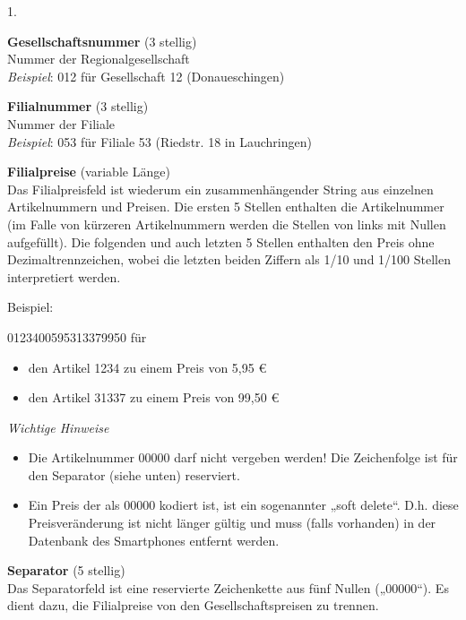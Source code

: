 \begin{seToplist}{1. }
\item[1. ]\textbf{Gesellschaftsnummer} (3 stellig)\label{interface-gnr}\\
	Nummer der Regionalgesellschaft\\
	\textit{Beispiel}: 012 für Gesellschaft 12 (Donaueschingen)
	
\item[2. ]\textbf{Filialnummer} (3 stellig)\\
	Nummer der Filiale\label{interface-fnr}\\
	\textit{Beispiel}: 053 für Filiale 53 (Riedstr. 18 in Lauchringen)
\item[3. ]\textbf{Filialpreise} (variable Länge)\label{interface-fpreise}\\
	Das Filialpreisfeld ist wiederum ein zusammenhängender String aus einzelnen Artikelnummern und Preisen.	Die ersten 5 Stellen enthalten die Artikelnummer (im Falle von kürzeren Artikelnummern werden die Stellen von links mit Nullen aufgefüllt). Die folgenden und auch letzten 5 Stellen enthalten den Preis ohne Dezimaltrennzeichen, wobei die letzten beiden Ziffern als 1/10 und 1/100 Stellen interpretiert werden.
	\begin{seToplist}{Beispiel: }
		\item[\textit{Beispiel}:] 0123400595313379950 für 
		\begin{itemize}
		\item[-] den Artikel 1234 zu einem Preis von 5,95 \euro
		\item[-] den Artikel 31337 zu einem Preis von 99,50 \euro
		\end{itemize}
	\end{seToplist}
	\textit{Wichtige Hinweise}
	\begin{itemize}
	\item[-] Die Artikelnummer 00000 darf nicht vergeben werden! Die Zeichenfolge ist für den Separator (siehe unten) reserviert.
	\item[-] Ein Preis der als 00000 kodiert ist, ist ein sogenannter „soft delete“. D.h. diese Preisveränderung ist nicht länger gültig und muss (falls vorhanden) in der Datenbank des Smartphones entfernt werden. 
	\end{itemize}
	
\item[4. ]\textbf{Separator} (5 stellig)\\
	Das Separatorfeld ist eine reservierte Zeichenkette aus fünf Nullen („00000“). Es dient dazu, die Filialpreise von den Gesellschaftspreisen zu trennen.
	

\end{seToplist}
